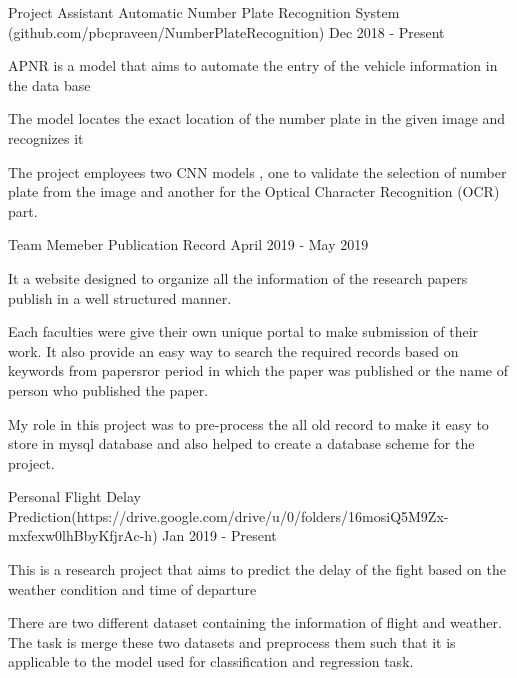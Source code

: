 \begin{cventries}
 \cventry
    {Project Assistant } %
   {Automatic Number Plate Recognition System ({\tiny github.com/pbcpraveen/NumberPlateRecognition})}%
    {} %
    {Dec 2018 - Present} %
    {
      \begin{cvitems} %
        \item {APNR is a model that aims to automate the entry of the vehicle information in the data base}
        \item{The model locates the exact location of the number plate in the given image and recognizes it}
         \item{The project employees two CNN models , one to validate the selection of number plate from the image and another for the Optical Character Recognition (OCR) part.}
      \end{cvitems}
      }
\cventry    
    {Team Memeber}
    {Publication Record}
    {}
    {April 2019 - May 2019}
    {
     \begin{cvitems} %
        \item {It a website designed to organize all the information of the research papers publish in a well structured manner. }
        \item{Each faculties were give their own unique portal to make submission of their work. It also provide an easy way to search the required records based on keywords from papersror period in which the paper was published or the name of person who published the paper.}
          \item {My role in this project was to pre-process the all old record to make it easy to store in mysql database and also helped to create a database scheme for the project. }
      \end{cvitems}
      
    }

\cventry
    {Personal}
    {Flight Delay Prediction({\tiny https://drive.google.com/drive/u/0/folders/16mosiQ5M9Zx-mxfexw0lhBbyKfjrAc-h})}
    {}
    {Jan 2019 - Present}
    {
     \begin{cvitems} %
        \item {This is a research project that aims to predict the delay of the fight based on the weather condition and time of departure }
        \item{There are two different dataset containing the information of flight and weather. The task is merge these two datasets and preprocess them such that it is applicable to the model used for classification and regression task. }
      \end{cvitems}
    }






\end{cventries}
